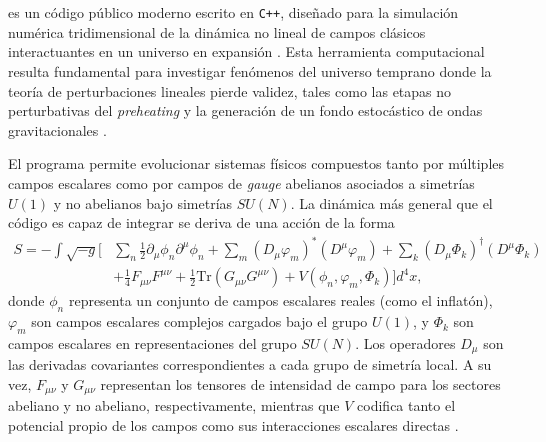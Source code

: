 \chapter{\CosmoLattice} \label{sec:cap4}

\CosmoLattice es un código público moderno escrito en \texttt{C++}, diseñado para la simulación numérica tridimensional de la dinámica no lineal de campos clásicos interactuantes en un universo en expansión \cite{CosmoLatticeNet, Figueroa2023}. Esta herramienta computacional resulta fundamental para investigar fenómenos del universo temprano donde la teoría de perturbaciones lineales pierde validez, tales como las etapas no perturbativas del \textit{preheating} y la generación de un fondo estocástico de ondas gravitacionales \cite{Amin_2014, Kofman_1997, Figueroa2024}.

El programa permite evolucionar sistemas físicos compuestos tanto por múltiples campos escalares como por campos de \textit{gauge} abelianos asociados a simetrías $U(1)$ y no abelianos bajo simetrías $SU(N)$. La dinámica más general que el código es capaz de integrar se deriva de una acción de la forma
\begin{equation}
    \begin{split}
        S = - \int \sqrt{-g} \Bigg[ &\sum_n \frac{1}{2} \partial_\mu \phi_n \partial^\mu \phi_n + \sum_m \left( D_\mu \varphi_m \right)^* \left( D^\mu \varphi_m \right) + \sum_k \left( D_\mu \Phi_k \right)^\dagger \left( D^\mu \Phi_k \right) \\
        &+ \frac{1}{4} F_{\mu \nu} F^{\mu \nu} + \frac{1}{2} \text{Tr} \left( G_{\mu\nu} G^{\mu\nu} \right) + V \left( \phi_n, \varphi_m, \Phi_k \right) \Bigg] d^4 x,
    \end{split}
\end{equation}
donde $\phi_n$ representa un conjunto de campos escalares reales (como el inflatón), $\varphi_m$ son campos escalares complejos cargados bajo el grupo $U(1)$, y $\Phi_k$ son campos escalares en representaciones del grupo $SU(N)$. Los operadores $D_\mu$ son las derivadas covariantes correspondientes a cada grupo de simetría local. A su vez, $F_{\mu\nu}$ y $G_{\mu\nu}$ representan los tensores de intensidad de campo para los sectores abeliano y no abeliano, respectivamente, mientras que $V$ codifica tanto el potencial propio de los campos como sus interacciones escalares directas \cite{Figueroa2021}.


